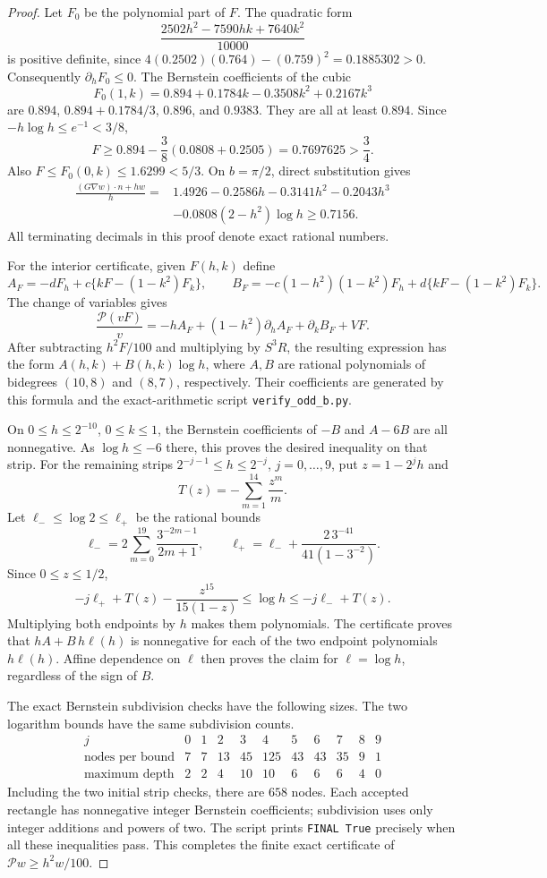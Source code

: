 \documentclass[reqno,11pt]{amsart}
\numberwithin{equation}{section}
\theoremstyle{remark}
\begin{document}
\begin{proof}
Let $F_0$ be the polynomial part of $F$.  The quadratic form
\[
 \frac{2502h^2-7590hk+7640k^2}{10000}
\]
is positive definite, since
$4(0.2502)(0.764)-(0.759)^2=0.1885302>0$.  Consequently
$\partial_hF_0\le0$.  The Bernstein coefficients of the cubic
\[
 F_0(1,k)=0.894+0.1784k-0.3508k^2+0.2167k^3
\]
are $0.894$, $0.894+0.1784/3$, $0.896$, and $0.9383$.
They are all at least $0.894$.  Since $-h\log h\le e^{-1}<3/8$,
\[
 F\ge0.894-\frac38(0.0808+0.2505)=0.7697625>\frac34.
\]
Also $F\le F_0(0,k)\le1.6299<5/3$.  On $b=\pi/2$, direct
substitution gives
\begin{align*}
 \frac{(G\nabla w)\cdot n+hw}{h}
 ={}&1.4926-0.2586h-0.3141h^2-0.2043h^3\\
   &-0.0808(2-h^2)\log h\ge0.7156.
\end{align*}
All terminating decimals in this proof denote exact rational numbers.

For the interior certificate, given $F(h,k)$ define
\[
 A_F=-dF_h+c\{kF-(1-k^2)F_k\},\qquad
 B_F=-c(1-h^2)(1-k^2)F_h+d\{kF-(1-k^2)F_k\}.
\]
The change of variables gives
\[
 \frac{\mathcal P(vF)}v=-hA_F+(1-h^2)\partial_hA_F+\partial_kB_F+VF.
\]
After subtracting $h^2F/100$ and multiplying by $S^3R$, the resulting expression has the form
$A(h,k)+B(h,k)\log h$, where $A,B$ are rational polynomials of
bidegrees $(10,8)$ and $(8,7)$, respectively.  Their coefficients are
generated by this formula and the exact-arithmetic script
\texttt{verify\_odd\_b.py}.

On $0\le h\le2^{-10}$, $0\le k\le1$, the Bernstein coefficients of
$-B$ and $A-6B$ are all nonnegative.  As $\log h\le-6$ there, this
proves the desired inequality on that strip.  For the remaining strips
$2^{-j-1}\le h\le2^{-j}$, $j=0,\ldots,9$, put $z=1-2^jh$ and
\[
 T(z)=-\sum_{m=1}^{14}\frac{z^m}{m}.
\]
Let $\ell_-\le\log2\le\ell_+$ be the rational bounds
\[
 \ell_-=2\sum_{m=0}^{19}\frac{3^{-2m-1}}{2m+1},\qquad
 \ell_+=\ell_-+
       \frac{2\,3^{-41}}{41(1-3^{-2})}.
\]
Since $0\le z\le1/2$,
\[
 -j\ell_++T(z)-\frac{z^{15}}{15(1-z)}
 \le\log h\le-j\ell_-+T(z).
\]
Multiplying both endpoints by $h$ makes them polynomials.  The
certificate proves that $hA+B\,h\ell(h)$ is nonnegative for each of
the two endpoint polynomials $h\ell(h)$.  Affine dependence on
$\ell$ then proves the claim for $\ell=\log h$, regardless of the
sign of $B$.

The exact Bernstein subdivision checks have the following sizes.  The
two logarithm bounds have the same subdivision counts.
\[
\begin{array}{c|rrrrrrrrrr}
 j&0&1&2&3&4&5&6&7&8&9\\\hline
 \text{nodes per bound}&7&7&13&45&125&43&43&35&9&1\\
 \text{maximum depth}&2&2&4&10&10&6&6&6&4&0
\end{array}
\]
Including the two initial strip checks, there are $658$ nodes.  Each
accepted rectangle has nonnegative integer Bernstein coefficients;
subdivision uses only integer additions and powers of two.  The script
prints \texttt{FINAL True} precisely when all these inequalities pass.
This completes the finite exact certificate of $\mathcal P w\ge h^2w/100$.
\end{proof}
\end{document}
